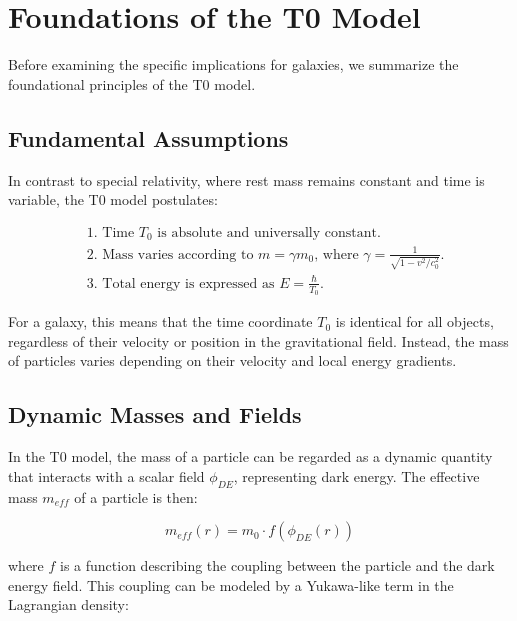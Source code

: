 \documentclass[a4paper,12pt]{article}
\begin{document}
	\section{Foundations of the T0 Model}
	
	Before examining the specific implications for galaxies, we summarize the foundational principles of the T0 model.
	
	\subsection{Fundamental Assumptions}
	
	In contrast to special relativity, where rest mass remains constant and time is variable, the T0 model postulates:
	
	\begin{tcolorbox}[colback=blue!5!white,colframe=blue!75!black,title=Basic Assumptions of the T0 Model]
		\begin{align}
			&\text{1. Time $T_0$ is absolute and universally constant.} \\
			&\text{2. Mass varies according to $m = \gamma m_0$, where $\gamma = \frac{1}{\sqrt{1-v^2/c_0^2}}$.} \\
			&\text{3. Total energy is expressed as $E = \frac{\hbar}{T_0}$.}
		\end{align}
	\end{tcolorbox}
	
	For a galaxy, this means that the time coordinate $T_0$ is identical for all objects, regardless of their velocity or position in the gravitational field. Instead, the mass of particles varies depending on their velocity and local energy gradients.
	
	\subsection{Dynamic Masses and Fields}
	
	In the T0 model, the mass of a particle can be regarded as a dynamic quantity that interacts with a scalar field $\phi_{DE}$, representing dark energy. The effective mass $m_{eff}$ of a particle is then:
	
	\begin{equation}
		m_{eff}(r) = m_0 \cdot f(\phi_{DE}(r))
	\end{equation}
	
	where $f$ is a function describing the coupling between the particle and the dark energy field. This coupling can be modeled by a Yukawa-like term in the Lagrangian density:
	
\end{document}
